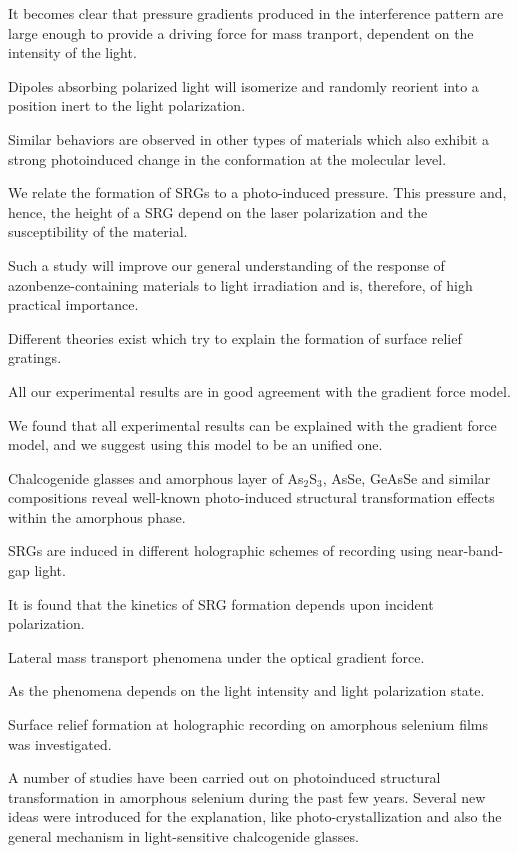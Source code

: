 It becomes clear that pressure gradients produced in the interference
pattern are large enough to provide a driving force for mass tranport,
dependent on the intensity of the light.

Dipoles absorbing polarized light will isomerize and randomly reorient
into a position inert to the light polarization.

Similar behaviors are observed in other types of materials which also
exhibit a strong photoinduced change in the conformation at the
molecular level.

We relate the formation of SRGs to a photo-induced pressure. This
pressure and, hence, the height of a SRG depend on the laser
polarization and the susceptibility of the material.

Such a study will improve our general understanding of the response of
azonbenze-containing materials to light irradiation and is, therefore,
of high practical importance.

Different theories exist which try to explain the formation of surface
relief gratings.

All our experimental results are in good agreement with the gradient
force model.

We found that all experimental results can be explained with the
gradient force model, and we suggest using this model to be an unified one.

Chalcogenide glasses and amorphous layer of As$_2$S$_3$, AsSe, GeAsSe
and similar compositions reveal well-known photo-induced structural
transformation effects within the amorphous phase.

SRGs are induced in different holographic schemes of recording using
near-band-gap light.

It is found that the kinetics of SRG formation depends upon incident
polarization.

Lateral mass transport phenomena under the optical gradient force.

As the phenomena depends on the light intensity and light polarization
state.

Surface relief formation at holographic recording on amorphous
selenium films was investigated.

A number of studies have been carried out on photoinduced structural
transformation in amorphous selenium during the past few
years. Several new ideas were introduced for the explanation, like
photo-crystallization and also the general mechanism in
light-sensitive chalcogenide glasses.

